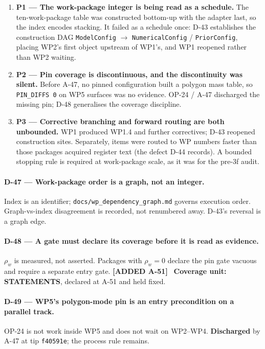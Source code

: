 \documentclass[
  10pt,
]{article}
\providecommand{\tightlist}{%
  \setlength{\itemsep}{0pt}\setlength{\parskip}{0pt}}
\newcommand{\amdnew}[1]{{\color{amdcolor}\footnotesize\textbf{[ADDED #1]}}\ }
\begin{document}
\begin{enumerate}
\tightlist
\item \textbf{P1 --- The work-package integer is being read as a schedule.} The ten-work-package table was constructed bottom-up with the adapter last, so the index encodes stacking. It failed as a schedule once: D-43 establishes the construction DAG \texttt{ModelConfig} $\rightarrow$ \texttt{NumericalConfig} / \texttt{PriorConfig}, placing WP2's first object upstream of WP1's, and WP1 reopened rather than WP2 waiting.
\item \textbf{P2 --- Pin coverage is discontinuous, and the discontinuity was silent.} Before A-47, no pinned configuration built a polygon mass table, so \texttt{PIN\_DIFFS 0} on WP5 surfaces was no evidence. OP-24 / A-47 discharged the missing pin; D-48 generalises the coverage discipline.
\item \textbf{P3 --- Corrective branching and forward routing are both unbounded.} WP1 produced WP1.4 and further correctives; D-43 reopened construction sites. Separately, items were routed to WP numbers faster than those packages acquired register text (the defect D-44 records). A bounded stopping rule is required at work-package scale, as it was for the pre-3f audit.
\end{enumerate}

\paragraph{D-47 --- Work-package order is a graph, not an integer.}
Index is an identifier; \texttt{docs/wp\_dependency\_graph.md} governs execution order. Graph-vs-index disagreement is recorded, not renumbered away. D-43's reversal is a graph edge.

\paragraph{D-48 --- A gate must declare its coverage before it is read as evidence.}
$\rho_w$ is measured, not asserted. Packages with $\rho_w = 0$ declare the pin gate vacuous and require a separate entry gate. \amdnew{A-51} \textbf{Coverage unit: STATEMENTS}, declared at A-51 and held fixed.

\paragraph{D-49 --- WP5's polygon-mode pin is an entry precondition on a parallel track.}
OP-24 is not work inside WP5 and does not wait on WP2--WP4. \textbf{Discharged} by A-47 at tip \texttt{f40591e}; the process rule remains.
\end{document}
